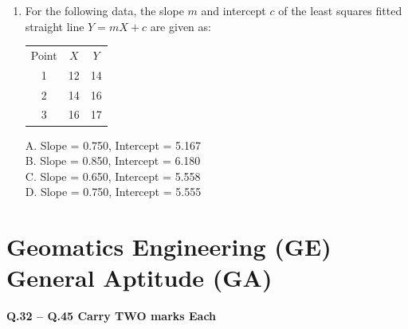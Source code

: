 \documentclass[journal,12pt,onecolumn]{IEEEtran}
\begin{document}
\begin{enumerate}
    \item For the following data, the slope $m$ and intercept $c$ of the least squares fitted straight line $Y = mX + c$ are given as:

\begin{tabular}{ccc}
Point & $X$ & $Y$ \\
1 & 12 & 14 \\
2 & 14 & 16 \\
3 & 16 & 17 \\
\end{tabular}

A. Slope = 0.750, Intercept = 5.167 \\
B. Slope = 0.850, Intercept = 6.180 \\
C. Slope = 0.650, Intercept = 5.558 \\
D. Slope = 0.750, Intercept = 5.555
\end{enumerate}

\section*{Geomatics Engineering (GE) \\ General Aptitude (GA)}

\textbf{Q.32 -- Q.45 Carry TWO marks Each}
\end{document}
